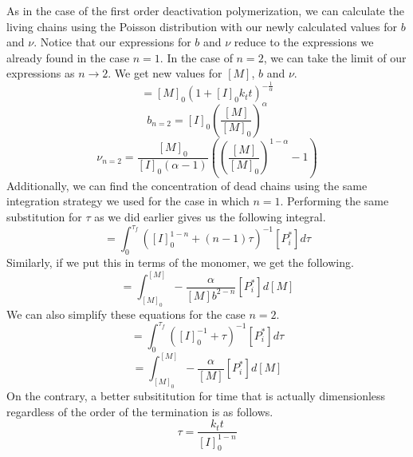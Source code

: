 \documentclass[12pt]{article}
\begin{document}
As in the case of the first order deactivation polymerization, we can calculate the living chains using the Poisson distribution with our newly calculated values for $b$ and $\nu$. Notice that our expressions for $b$ and $\nu$ reduce to the expressions we already found in the case $n=1$. In the case of $n=2$, we can take the limit of our expressions as $n\rightarrow 2$. We get new values for $[M]$, $b$ and $\nu$.
\begin{equation}
  [M]=[M]_0\left(1+[I]_0k_tt\right)^{-\frac{1}{\alpha}}
\end{equation}
\begin{equation}
  b_{n=2} = [I]_0\left(\frac{[M]}{[M]_0}\right)^{\alpha}
\end{equation}
\begin{equation}
  \nu_{n=2} = \frac{[M]_0}{[I]_0(\alpha-1)}\left(\left(\frac{[M]}{[M]_0}\right)^{1-\alpha}-1\right)
\end{equation}
Additionally, we can find the concentration of dead chains using the same integration strategy we used for the case in which $n=1$. Performing the same substitution for $\tau$ as we did earlier gives us the following integral.
\begin{equation}
  [P_i]=\int_{0}^{\tau_f}([I]_0^{1-n}+(n-1)\tau)^{-1}[P_i^*]d\tau
\end{equation}
Similarly, if we put this in terms of the monomer, we get the following.
\begin{equation}
  [P_i]=\int_{[M]_0}^{[M]}-\frac{\alpha}{[M]b^{2-n}}[P_i^*]d[M]
\end{equation}
We can also simplify these equations for the case $n=2$.
\begin{equation}
  [P_i]=\int_{0}^{\tau_f}([I]_0^{-1}+\tau)^{-1}[P_i^*]d\tau
\end{equation}
\begin{equation}
  [P_i]=\int_{[M]_0}^{[M]}-\frac{\alpha}{[M]}[P_i^*]d[M]
\end{equation}
On the contrary, a better subsititution for time that is actually dimensionless regardless of the order of the termination is as follows.
\begin{equation}
  \tau = \frac{k_tt}{[I]_0^{1-n}}
\end{equation}
\end{document}
